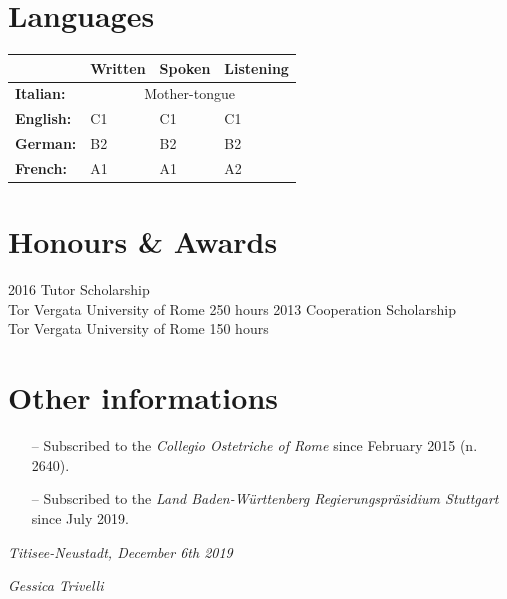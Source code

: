 \documentclass[11pt]{friggeri-cv}
\begin{document}
\section{Languages}
\begin{table}[!h]
  \centering
  \renewcommand{\arraystretch}{1.45}
  \begin{tabular}{ p{3cm} p{3cm} p{3cm} p{3cm} }
    \hline
      & \textbf{Written}  
      & \textbf{Spoken} 
      & \textbf{Listening} \\ 
    \hline
    \textbf{Italian:}   
      & \multicolumn{3}{c}{Mother-tongue} \\
    \textbf{English:}
      & C1 
      & C1 
      & C1 \\ 
    \textbf{German:} 
      & B2 
      & B2 
      & B2 \\ 
    \textbf{French:} 
      & A1 
      & A1 
      & A2 \\
    \hline
  \end{tabular}
\end{table}

\section{Honours \& Awards}
\begin{entrylist}
  \entry
    {2016}
    {Tutor Scholarship}
    {\\Tor Vergata University of Rome}
    {250 hours}
  \entry
    {2013}
    {Cooperation Scholarship}
    {\\Tor Vergata University of Rome}
    {150 hours}
\end{entrylist}

\section{Other informations}
\begin{itemize}
  \item[--] Subscribed to the \textit{Collegio Ostetriche of Rome} since 
  February 2015 (n. 2640).
  \item[--] Subscribed to the \emph{Land Baden-W{\"u}rttenberg 
    Regierungspr{\"a}sidium Stuttgart} since July 2019.
\end{itemize}


\vspace{3.5cm}
\begin{flushleft}
  \large\emph{Titisee-Neustadt, December 6th 2019}
\end{flushleft}
\begin{flushright}
  \large\emph{Gessica Trivelli}
\end{flushright}
\end{document}
